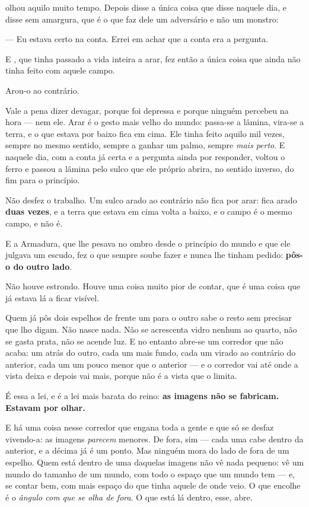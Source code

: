 \documentclass[livro.tex]{subfiles}
\begin{document}
\medskip

\Drk olhou aquilo muito tempo. Depois disse a única coisa que disse naquele dia, e disse
sem amargura, que é o que faz dele um adversário e não um monstro:

--- Eu estava certo na conta. Errei em achar que a conta era a pergunta.

\medskip

E \Ben , que tinha passado a vida inteira a arar, fez então a única coisa que ainda não
tinha feito com aquele campo.

Arou-o ao contrário.

\medskip

Vale a pena dizer devagar, porque foi depressa e porque ninguém percebeu na hora --- nem
ele. Arar é o gesto mais velho do mundo: passa-se a lâmina, vira-se a terra, e o que
estava por baixo fica em cima. Ele tinha feito aquilo mil vezes, sempre no mesmo sentido,
sempre a ganhar um palmo, sempre \emph{mais perto}. E naquele dia, com a conta já certa e
a pergunta ainda por responder, voltou o ferro e passou a lâmina pelo sulco que ele
próprio abrira, no sentido inverso, do fim para o princípio.

Não desfez o trabalho. Um sulco arado ao contrário não fica por arar: fica arado
\textbf{duas vezes}, e a terra que estava em cima volta a baixo, e o campo é o mesmo
campo, e não é.

E a Armadura, que lhe pesava no ombro desde o princípio do mundo e que ele julgava um
escudo, fez o que sempre soube fazer e nunca lhe tinham pedido: \textbf{pôs-o do outro
lado}.

\medskip

Não houve estrondo. Houve uma coisa muito pior de contar, que é uma coisa que já estava
lá a ficar visível.

\medskip

Quem já pôs dois espelhos de frente um para o outro sabe o resto sem precisar que lho
digam. Não nasce nada. Não se acrescenta vidro nenhum ao quarto, não se gasta prata, não
se acende luz. E no entanto abre-se um corredor que não acaba: um atrás do outro, cada um
mais fundo, cada um virado ao contrário do anterior, cada um um pouco menor que o
anterior --- e o corredor vai até onde a vista deixa e depois vai mais, porque não é a
vista que o limita.

É essa a lei, e é a lei mais barata do reino: \textbf{as imagens não se fabricam. Estavam
por olhar.}

E há uma coisa nesse corredor que engana toda a gente e que só se desfaz vivendo-a: as
imagens \emph{parecem} menores. De fora, sim --- cada uma cabe dentro da anterior, e a
décima já é um ponto. Mas ninguém mora do lado de fora de um espelho. Quem está dentro de
uma daquelas imagens não vê nada pequeno: vê um mundo do tamanho de um mundo, com todo o
espaço que um mundo tem --- e, se contar bem, com mais espaço do que tinha aquele de onde
veio. O que encolhe é o \emph{ângulo com que se olha de fora}. O que está lá dentro, esse,
abre.
\end{document}
